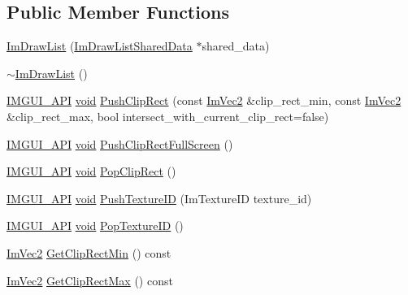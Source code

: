 \subsection*{Public Member Functions}
\begin{DoxyCompactItemize}
\item 
\hyperlink{structImDrawList_a6360ccc7ce978f1497d6291a4a6f87eb}{Im\+Draw\+List} (\hyperlink{structImDrawListSharedData}{Im\+Draw\+List\+Shared\+Data} $\ast$shared\+\_\+data)
\item 
\hyperlink{structImDrawList_a19fd8d920c202cf8ba5f5c55c43d1d2a}{$\sim$\+Im\+Draw\+List} ()
\item 
\hyperlink{imgui_8h_a43829975e84e45d1149597467a14bbf5}{I\+M\+G\+U\+I\+\_\+\+A\+PI} \hyperlink{imgui__impl__opengl3__loader_8h_ac668e7cffd9e2e9cfee428b9b2f34fa7}{void} \hyperlink{structImDrawList_a608a9d9a83715ba87dced8321ed64329}{Push\+Clip\+Rect} (const \hyperlink{structImVec2}{Im\+Vec2} \&clip\+\_\+rect\+\_\+min, const \hyperlink{structImVec2}{Im\+Vec2} \&clip\+\_\+rect\+\_\+max, bool intersect\+\_\+with\+\_\+current\+\_\+clip\+\_\+rect=false)
\item 
\hyperlink{imgui_8h_a43829975e84e45d1149597467a14bbf5}{I\+M\+G\+U\+I\+\_\+\+A\+PI} \hyperlink{imgui__impl__opengl3__loader_8h_ac668e7cffd9e2e9cfee428b9b2f34fa7}{void} \hyperlink{structImDrawList_a0ab1ab409f0e269755e50a77901bae39}{Push\+Clip\+Rect\+Full\+Screen} ()
\item 
\hyperlink{imgui_8h_a43829975e84e45d1149597467a14bbf5}{I\+M\+G\+U\+I\+\_\+\+A\+PI} \hyperlink{imgui__impl__opengl3__loader_8h_ac668e7cffd9e2e9cfee428b9b2f34fa7}{void} \hyperlink{structImDrawList_a44f40c59ca755f559020f5a7fa81103a}{Pop\+Clip\+Rect} ()
\item 
\hyperlink{imgui_8h_a43829975e84e45d1149597467a14bbf5}{I\+M\+G\+U\+I\+\_\+\+A\+PI} \hyperlink{imgui__impl__opengl3__loader_8h_ac668e7cffd9e2e9cfee428b9b2f34fa7}{void} \hyperlink{structImDrawList_a7ac41e329a9df911b4823ef0150cee16}{Push\+Texture\+ID} (Im\+Texture\+ID texture\+\_\+id)
\item 
\hyperlink{imgui_8h_a43829975e84e45d1149597467a14bbf5}{I\+M\+G\+U\+I\+\_\+\+A\+PI} \hyperlink{imgui__impl__opengl3__loader_8h_ac668e7cffd9e2e9cfee428b9b2f34fa7}{void} \hyperlink{structImDrawList_ade9286c5ca58753f7bd571b30e2ff76c}{Pop\+Texture\+ID} ()
\item 
\hyperlink{structImVec2}{Im\+Vec2} \hyperlink{structImDrawList_a9d83896d3eb434a9e1072d56523a2754}{Get\+Clip\+Rect\+Min} () const
\item 
\hyperlink{structImVec2}{Im\+Vec2} \hyperlink{structImDrawList_a8e484a61eab501c1c1c416a8b45bb08e}{Get\+Clip\+Rect\+Max} () const

\end{DoxyCompactItemize}
